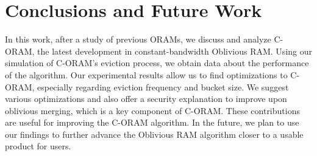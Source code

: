 \documentclass[12pt, oneside]{article}   	%
\begin{document}
\section{Conclusions and Future Work}
In this work, after a study of previous ORAMs, we discuss and analyze C-ORAM, the latest development in constant-bandwidth Oblivious RAM. Using our simulation of C-ORAM's eviction process, we obtain data about the performance of the algorithm. Our experimental results allow us to find optimizations to C-ORAM, especially regarding eviction frequency and bucket size. We suggest various optimizations and also offer a security explanation to improve upon oblivious merging, which is a key component of C-ORAM.  These contributions are useful for improving the C-ORAM algorithm. In the future, we plan to use our findings to further advance the Oblivious RAM algorithm closer to a usable product for users.




\end{document}
